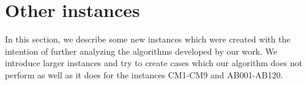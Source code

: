 \begin{table}
	\begin{center}
		\caption{Solutions of MCER-$k$ for instances AB061-AB120.}
		\label{tab:mcer-results-ab2}
	\end{center}
\end{table}

\section{Other instances}

In this section, we describe some new instances which were created with the intention of further analyzing the algorithms developed by our work. We introduce larger instances and try to create cases which our algorithm does not perform as well as it does for the instances CM1-CM9 and AB001-AB120.
